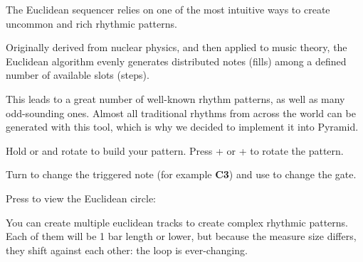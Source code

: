 The Euclidean sequencer relies on one of the most intuitive ways to create uncommon and rich rhythmic patterns.

Originally derived from nuclear physics, and then applied to music theory, the Euclidean algorithm evenly generates distributed notes (fills) among a defined number of available slots (steps).


This leads to a great number of well-known rhythm patterns, as well as many odd-sounding ones. Almost all traditional rhythms from across the world can be generated with this tool, which is why we decided to implement it into Pyramid.


Hold  or  and rotate \encodericon{} to build your pattern. Press  + \btn{<} or  + \btn{>} to rotate the pattern.



Turn \encodericon{} to change the triggered note (for example \textbf{C3\sharp}) and use  to change the gate.

Press  to view the Euclidean circle:



You can create multiple euclidean tracks to create complex rhythmic patterns. Each of them will be 1 bar length or lower, but because the measure size differs, they shift against each other: the loop is ever-changing.



